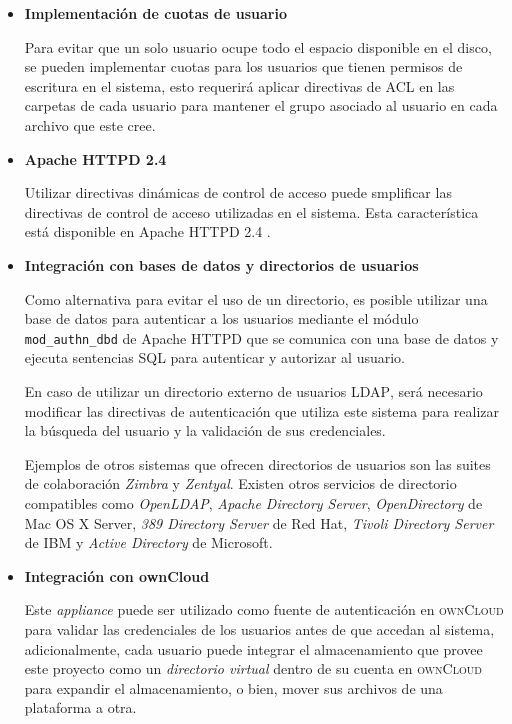 \begin{itemize}
  \item \textbf{Implementaci\'{o}n de cuotas de usuario}

Para evitar que un solo usuario ocupe todo el espacio disponible en el disco, se pueden implementar cuotas para los usuarios que tienen permisos de escritura en el sistema, esto requerir\'{a} aplicar directivas de \textsc{ACL} en las carpetas de cada usuario para mantener el grupo asociado al usuario en cada archivo que este cree. 

  \item \textbf{Apache HTTPD 2.4}

Utilizar directivas din\'{a}micas de control de acceso puede smplificar las directivas de control de acceso utilizadas en el sistema. Esta caracter\'{i}stica est\'{a} disponible en Apache \textsc{HTTPD} 2.4 \cite{_mod_authz_core_????} \cite{_mod_authnz_ldap_????}.

  \item \textbf{Integraci\'{o}n con bases de datos y directorios de usuarios}


Como alternativa para evitar el uso de un directorio, es posible utilizar una base de datos para autenticar a los usuarios mediante el m\'{o}dulo \texttt{mod\_authn\_dbd} de Apache \textsc{HTTPD} que se comunica con una base de datos y ejecuta sentencias \textsc{SQL} para autenticar y autorizar al usuario.

En caso de utilizar un directorio externo de usuarios \textsc{LDAP}, ser\'{a} necesario modificar las directivas de autenticaci\'{o}n que utiliza este sistema para realizar la b\'{u}squeda del usuario y la validaci\'{o}n de sus credenciales.

Ejemplos de otros sistemas que ofrecen directorios de usuarios son las suites de colaboraci\'{o}n \textsl{Zimbra} y \textsl{Zentyal}.  Existen otros servicios de directorio compatibles como \textit{OpenLDAP}, \textit{Apache Directory Server}, \textit{OpenDirectory} de Mac OS X Server, \textit{389 Directory Server} de Red Hat, \textit{Tivoli Directory Server} de IBM y \textit{Active Directory} de Microsoft.

  \item \textbf{Integraci\'{o}n con ownCloud}

Este \textsl{appliance} puede ser utilizado como fuente de autenticaci\'{o}n en \textsc{ownCloud} para validar las credenciales de los usuarios antes de que accedan al sistema, adicionalmente, cada usuario puede integrar el almacenamiento que provee este proyecto como un \textsl{directorio virtual} dentro de su cuenta en \textsc{ownCloud} para expandir el almacenamiento, o bien, mover sus archivos de una plataforma a otra.

\end{itemize}

